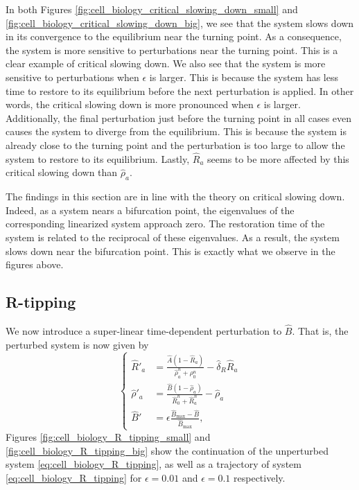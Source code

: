 In both Figures \ref{fig:cell_biology_critical_slowing_down_small} and \ref{fig:cell_biology_critical_slowing_down_big}, we see that the system slows down in its convergence to the equilibrium near the turning point.
As a consequence, the system is  more sensitive to perturbations near the turning point. This is a clear example of critical slowing down. We also see that the system is more sensitive to perturbations when $\epsilon$ is larger.
This is because the system has less time to restore to its equilibrium before the next perturbation is applied. In other words, the critical slowing down is more pronounced when $\epsilon$ is larger. Additionally,
the final perturbation just before the turning point in all cases even causes the system to diverge from the equilibrium. This is because the system is already close to the turning point and the perturbation is too 
large to allow the system to restore to its equilibrium. Lastly, $\hat{R}_a$ seems to be more affected by this critical slowing down than $\hat{\rho}_a$.

The findings in this section are in line with the theory on critical slowing down. Indeed, as a system nears a bifurcation point, the eigenvalues of the corresponding linearized system approach zero. The restoration time of the system
is related to the reciprocal of these eigenvalues. As a result, the system slows down near the bifurcation point. This is exactly what we observe in the figures above.

\subsection{R-tipping}
We now introduce a super-linear time-dependent perturbation to $\hat{B}$. That is, the perturbed system is now given by
\begin{equation}
    \begin{cases}
        \hat{R}'_a &= \frac{\hat{A} \left(1 - \hat{R}_{a}\right)}{\hat{\rho}_a^{n} + \rho_{0}^{n}}  - \hat{\delta}_{R} \hat{R}_{a}\\
        \hat{\rho}'_a &= \frac{\hat{B} \left(1 - \hat{\rho}_a\right)}{\hat{R}_0^{n} + \hat{R}_{a}^{n}} - \hat{\rho}_a\\
        \hat{B}' &= \epsilon \frac{\hat{B}_{\textrm{max}}-\hat{B}}{\hat{B}_{\textrm{max}}},
    \end{cases}
\label{eq:cell_biology_R_tipping}
\end{equation}
Figures \ref{fig:cell_biology_R_tipping_small} and \ref{fig:cell_biology_R_tipping_big} show the continuation of the unperturbed system \ref{eq:cell_biology_R_tipping}, as well as a trajectory of  
system \ref{eq:cell_biology_R_tipping} for $\epsilon = 0.01$ and $\epsilon = 0.1$ respectively.

